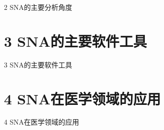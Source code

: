\documentclass[11pt]{beamer}
\begin{document}
\begin{CJK}{UTF8}{gbsn}
\begin{frame}[plain]

\begin{center}
	\Huge 2 SNA的主要分析角度
\end{center}

\end{frame}


\section{3 SNA的主要软件工具}

\begin{frame}[plain]

\begin{center}
	\Huge 3 SNA的主要软件工具
\end{center}

\end{frame}


\section{4 SNA在医学领域的应用}

\begin{frame}[plain]

\begin{center}
	\Huge 4 SNA在医学领域的应用
\end{center}

\end{frame}



\end{CJK}
\end{document}
